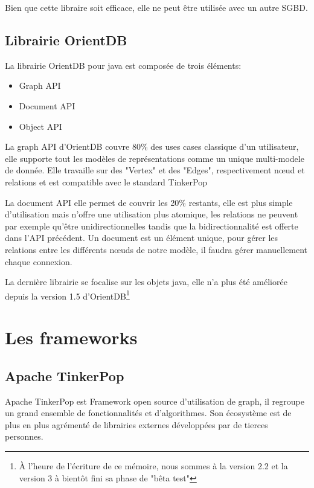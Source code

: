 \documentclass[a4paper,fleqn,12pt]{report}
\begin{document}
Bien que cette libraire soit efficace, elle ne peut être utilisée avec un autre SGBD. 

\subsection{Librairie OrientDB}

La librairie OrientDB pour java est composée de trois éléments:

\begin{itemize}
\item Graph API
\item Document API
\item Object API
\end{itemize}

La graph API d'OrientDB couvre 80\% des uses cases classique d'un utilisateur, elle supporte tout les modèles de représentations comme un unique multi-modele de donnée. Elle travaille sur des "Vertex" et des "Edges", respectivement nœud et relations et est compatible avec le standard TinkerPop

La document API elle permet de couvrir les 20\% restants, elle est plus simple d'utilisation mais n'offre une utilisation plus atomique, les relations ne peuvent par exemple qu'être unidirectionnelles tandis que la bidirectionnalité est offerte dans l'API précédent. Un document est un élément unique, pour gérer les relations entre les différents nœuds de notre modèle, il faudra gérer manuellement chaque connexion.

La dernière librairie se focalise sur les objets java, elle n'a plus été améliorée depuis la version 1.5 d'OrientDB\footnote{À l'heure de l'écriture de ce mémoire, nous sommes à la version 2.2 et la version 3 à bientôt fini sa phase de "bêta test"}

\section{Les frameworks}

\subsection{Apache TinkerPop}

Apache TinkerPop est Framework open source d'utilisation de graph, il regroupe un grand ensemble de fonctionnalités et d'algorithmes. Son écosystème est de plus en plus agrémenté de librairies externes développées par de tierces personnes.
\end{document}
